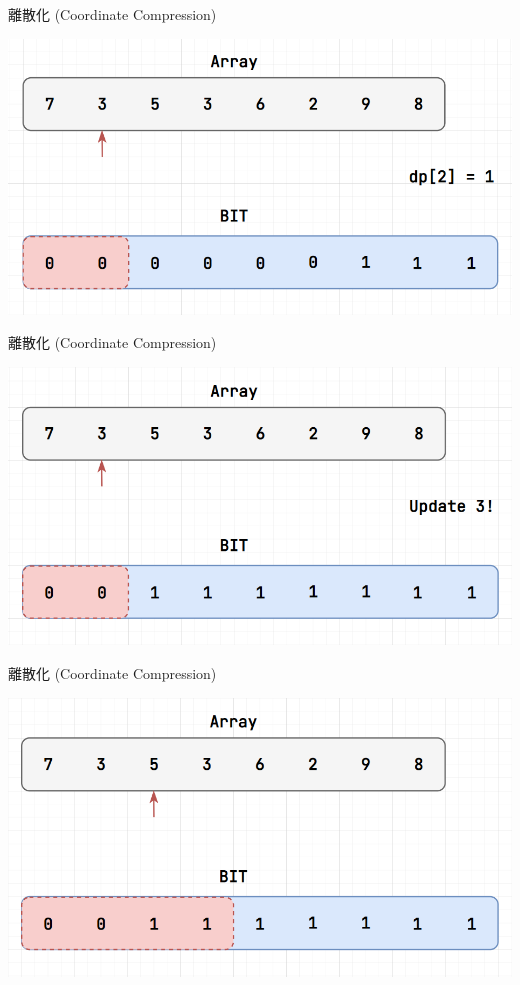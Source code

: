 \documentclass[aspectratio=169]{beamer}
\begin{document}
    \begin{frame}{離散化 (Coordinate Compression)}
        \begin{center}
            \includegraphics[scale=0.45]{LIS/step5.png}
        \end{center}
    \end{frame}

    \begin{frame}{離散化 (Coordinate Compression)}
        \begin{center}
            \includegraphics[scale=0.45]{LIS/step6.png}
        \end{center}
    \end{frame}

    \begin{frame}{離散化 (Coordinate Compression)}
        \begin{center}
            \includegraphics[scale=0.45]{LIS/step7.png}
        \end{center}
    \end{frame}
\end{document}

